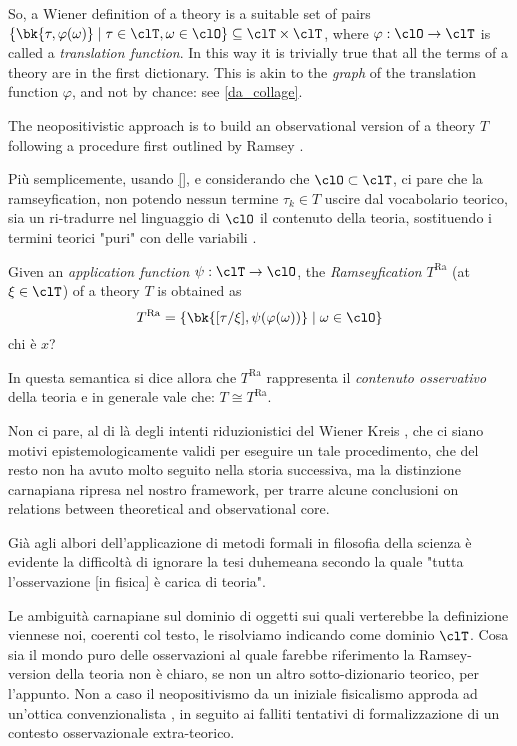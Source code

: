 So, a Wiener definition of a theory is a suitable set of pairs $\{\bk{\tau,\varphi(\omega)} \mid \tau\in\clT, \omega \in\clO\}\subseteq \clT\times\clT$, where $\varphi: \clO \to \clT$ is called a \emph{translation function}. In this way it is trivially true that all the terms of a theory are in the first dictionary. This is akin to the \emph{graph} of the translation function $\varphi$, and not by chance: see \autoref{da_collage}.

The neopositivistic approach is to build an observational version of a theory $T$ following a procedure first outlined by Ramsey \cite{?}.

Più semplicemente, usando \autoref{}, e considerando che $\clO \subset \clT$, ci pare che la ramseyfication, non potendo nessun termine $\tau_k \in T$ uscire dal vocabolario teorico, sia un ri-tradurre nel linguaggio di $\clO$ il contenuto della teoria, sostituendo i termini teorici "puri" con delle variabili \cite{?}.
\begin{definition}
	Given an \emph{application function} $\psi: \clT \to \clO$, the \emph{Ramseyfication} $T^\text{Ra}$ (at $\xi\in\clT$) of a theory $T$ is obtained as  
	\[ 
		T^\text{Ra} = \{\bk{[\tau/\xi], \psi(\varphi (\omega))} \mid \omega\in\clO\} 
	\] {\color{red} chi è $x$?}
\end{definition}
In questa semantica si dice allora che $T^\text{Ra}$ rappresenta il \emph{contenuto osservativo} della teoria e in generale vale che: $T \cong T^\text{Ra}$. 



Non ci pare, al di là degli intenti riduzionistici del Wiener Kreis \cite{Weinb}, che ci siano motivi epistemologicamente validi per eseguire un tale procedimento, che del resto non ha avuto molto seguito nella storia successiva, ma la distinzione carnapiana ripresa nel nostro framework, per trarre alcune conclusioni on relations between theoretical and observational core.

Già agli albori dell'applicazione di metodi formali in filosofia della scienza è evidente la difficoltà di ignorare la tesi duhemeana secondo la quale "tutta l'osservazione [in fisica] è carica di teoria". 

Le ambiguità carnapiane sul dominio di oggetti sui quali verterebbe la definizione viennese noi, coerenti col testo, le risolviamo indicando come dominio $\clT$. Cosa sia il mondo puro delle osservazioni al quale farebbe riferimento la Ramsey-version della teoria non è chiaro, se non un altro sotto-dizionario teorico, per l'appunto. Non a caso il neopositivismo da un iniziale fisicalismo approda ad un'ottica convenzionalista \cite{?}, in seguito ai falliti tentativi di formalizzazione di un contesto osservazionale extra-teorico. 

